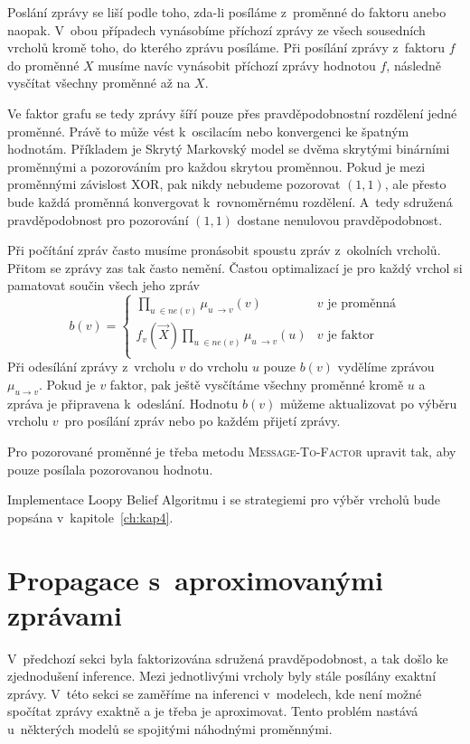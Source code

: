 Poslání zprávy se liší podle toho, zda-li posíláme z~proměnné do faktoru anebo naopak.
V~obou případech vynásobíme příchozí zprávy ze všech sousedních vrcholů kromě toho, do kterého zprávu posíláme.
Při posílání zprávy z~faktoru $f$ do proměnné $X$ musíme navíc vynásobit příchozí zprávy hodnotou $f$, následně vysčítat všechny proměnné až na $X$.

Ve faktor grafu se tedy zprávy šíří pouze přes pravděpodobnostní rozdělení jedné proměnné.
Právě to může vést k~oscilacím nebo konvergenci ke špatným hodnotám. 
Příkladem je Skrytý Markovský model se dvěma skrytými binárními proměnnými a pozorováním pro každou skrytou proměnnou.
Pokud je mezi proměnnými závislost XOR, pak nikdy nebudeme pozorovat $(1, 1)$, ale přesto bude každá proměnná konvergovat k~rovnoměrnému rozdělení. A~tedy sdružená pravděpodobnost pro pozorování $(1, 1)$ dostane nenulovou pravděpodobnost.

Při počítání zpráv často musíme pronásobit spoustu zpráv z~okolních vrcholů.
Přitom se zprávy zas tak často nemění.
Častou optimalizací je pro každý vrchol si pamatovat součin všech jeho zpráv
\begin{equation}
    b(v) = \begin{cases}
        \prod_{u~\in ne(v)} \mu_{u~\rightarrow v}(v) & \mbox{$v$ je proměnná} \\
        f_v(\vec{X}) \prod_{u~\in ne(v)} \mu_{u~\rightarrow v}(u) & \mbox{$v$ je faktor} \\
    \end{cases}
\end{equation}
Při odesílání zprávy z~vrcholu $v$ do vrcholu $u$ pouze $b(v)$ vydělíme zprávou $\mu_{u \rightarrow v}$.
Pokud je $v$ faktor, pak ještě vysčítáme všechny proměnné kromě $u$ a zpráva je připravena k~odeslání.
Hodnotu $b(v)$ můžeme aktualizovat po výběru vrcholu $v$~pro posílání zpráv nebo po každém přijetí zprávy.

Pro pozorované proměnné je třeba metodu \textsc{Message-To-Factor} upravit tak, aby pouze posílala pozorovanou hodnotu.

Implementace Loopy Belief Algoritmu i se strategiemi pro výběr vrcholů bude popsána v~kapitole~\ref{ch:kap4}.

\section{Propagace s~aproximovanými zprávami}

V~předchozí sekci byla faktorizována sdružená pravděpodobnost, a tak došlo ke zjednodušení inference.
Mezi jednotlivými vrcholy byly stále posílány exaktní zprávy.
V~této sekci se zaměříme na inferenci v~modelech, kde není možné spočítat zprávy exaktně a je třeba je aproximovat.
Tento problém nastává u~některých modelů se spojitými náhodnými proměnnými.

